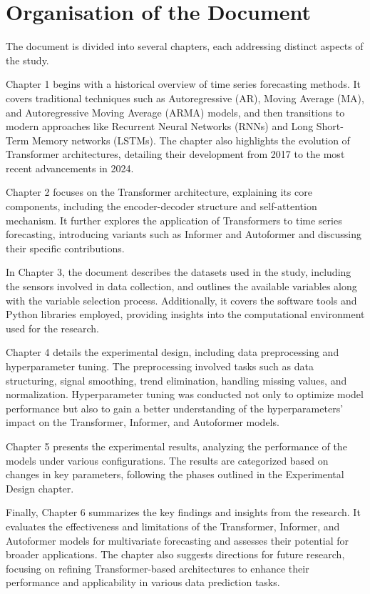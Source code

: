 \section{Organisation of the Document}

The document is divided into several chapters, each addressing distinct aspects of the study.

Chapter 1 begins with a historical overview of time series forecasting methods. It covers traditional techniques such as Autoregressive (AR), Moving Average (MA), and Autoregressive Moving Average (ARMA) models, and then transitions to modern approaches like Recurrent Neural Networks (RNNs) and Long Short-Term Memory networks (LSTMs). The chapter also highlights the evolution of Transformer architectures, detailing their development from 2017 to the most recent advancements in 2024.

Chapter 2 focuses on the Transformer architecture, explaining its core components, including the encoder-decoder structure and self-attention mechanism. It further explores the application of Transformers to time series forecasting, introducing variants such as Informer and Autoformer and discussing their specific contributions.

In Chapter 3, the document describes the datasets used in the study, including the sensors involved in data collection, and outlines the available variables along with the variable selection process. Additionally, it covers the software tools and Python libraries employed, providing insights into the computational environment used for the research.

Chapter 4 details the experimental design, including data preprocessing and hyperparameter tuning. The preprocessing involved tasks such as data structuring, signal smoothing, trend elimination, handling missing values, and normalization. Hyperparameter tuning was conducted not only to optimize model performance but also to gain a better understanding of the hyperparameters' impact on the Transformer, Informer, and Autoformer models.

Chapter 5 presents the experimental results, analyzing the performance of the models under various configurations. The results are categorized based on changes in key parameters, following the phases outlined in the Experimental Design chapter.

Finally, Chapter 6 summarizes the key findings and insights from the research. It evaluates the effectiveness and limitations of the Transformer, Informer, and Autoformer models for multivariate forecasting and assesses their potential for broader applications. The chapter also suggests directions for future research, focusing on refining Transformer-based architectures to enhance their performance and applicability in various data prediction tasks.
